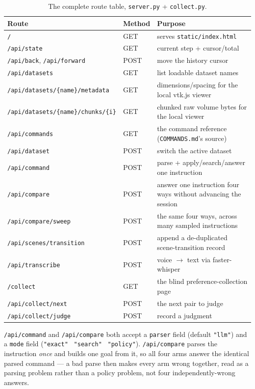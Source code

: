 \documentclass[10pt]{article}
\newcommand{\code}[1]{\texttt{#1}}
\begin{document}
\begin{table}[h]
\centering\small
\begin{tabular}{@{}lll@{}}
\toprule
\textbf{Route} & \textbf{Method} & \textbf{Purpose} \\
\midrule
\code{/} & GET & serves \code{static/index.html} \\
\code{/api/state} & GET & current step + cursor/total \\
\code{/api/back}, \code{/api/forward} & POST & move the history cursor \\
\code{/api/datasets} & GET & list loadable dataset names \\
\code{/api/datasets/\{name\}/metadata} & GET & dimensions/spacing for the local vtk.js viewer \\
\code{/api/datasets/\{name\}/chunks/\{i\}} & GET & chunked raw volume bytes for the local viewer \\
\code{/api/commands} & GET & the command reference (\code{COMMANDS.md}'s source) \\
\code{/api/dataset} & POST & switch the active dataset \\
\code{/api/command} & POST & parse + apply/search/answer one instruction \\
\code{/api/compare} & POST & answer one instruction four ways without advancing the session \\
\code{/api/compare/sweep} & POST & the same four ways, across many sampled instructions \\
\code{/api/scenes/transition} & POST & append a de-duplicated scene-transition record \\
\code{/api/transcribe} & POST & voice $\rightarrow$ text via faster-whisper \\
\code{/collect} & GET & the blind preference-collection page \\
\code{/api/collect/next} & POST & the next pair to judge \\
\code{/api/collect/judge} & POST & record a judgment \\
\bottomrule
\end{tabular}
\caption{The complete route table, \code{server.py} + \code{collect.py}.}
\end{table}

\code{/api/command} and \code{/api/compare} both accept a \code{parser}
field (default \code{"llm"}) and a \code{mode} field (\code{"exact"}
\textbar\ \code{"search"} \textbar\ \code{"policy"}). \code{/api/compare}
parses the instruction \emph{once} and builds one goal from it, so all four
arms answer the identical parsed command --- a bad parse then makes every arm
wrong together, read as a parsing problem rather than a policy problem, not
four independently-wrong answers.
\end{document}
